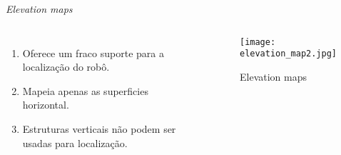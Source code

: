\begin{frame}[t]{\textit{Elevation maps}} 
    \transdissolve[duration=0.5]    
        \begin{columns}[t]
                \begin{enumerate}
                    \item Oferece um fraco suporte para a localização do robô.
                    \item Mapeia apenas as superficies horizontal.
                    \item Estruturas verticais não podem ser usadas para localização.
                \end{enumerate}
            \begin{center}
                \begin{figure}
                    \texttt{[image: elevation\_map2.jpg]}
                    \caption{Elevation maps\cite{article}}
                \end{figure}
            \end{center}
        \end{columns}
\end{frame}


